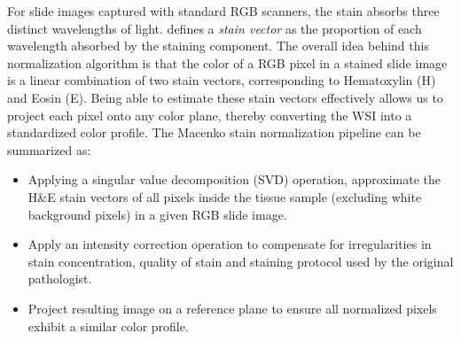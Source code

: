 \documentclass{l4proj}
\begin{document}
For slide images captured with standard RGB scanners, the stain absorbs three distinct wavelengths of light. \cite{macenko2009method} defines a \textit{stain vector} as the proportion of each wavelength absorbed by the staining component. The overall idea behind this normalization algorithm is that the color of a RGB pixel in a stained slide image is a linear combination of two stain vectors, corresponding to Hematoxylin (H) and Eosin (E). Being able to estimate these stain vectors effectively allows us to project each pixel onto any color plane, thereby converting the WSI into a standardized color profile. The Macenko stain normalization pipeline can be summarized as:
\begin{itemize}
    \item Applying a singular value decomposition (SVD) operation, approximate the H\&E stain vectors of all pixels inside the tissue sample (excluding white background pixels) in a given RGB slide image. 
    \item Apply an intensity correction operation to compensate for irregularities in stain concentration, quality of stain and staining protocol used by the original pathologist. 
    \item Project resulting image on a reference plane to ensure all normalized pixels exhibit a similar color profile. 
\end{itemize}
\hfill\\
\end{document}
